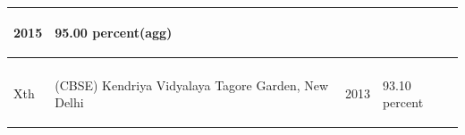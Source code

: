 \documentclass[11pt]{article}
\begin{document}
\begin{minipage}{0.75\linewidth}
\begin{center}
\begin{tabular}{ |m{4cm}| m{4cm}| m{2cm}| m{3cm}| }
\begin{center}
2015
\end{center}&
\begin{center}
95.00 percent(agg)
\end{center}\\
\hline
\begin{center}
AISSE\\
Xth
\end{center}&
\begin{center}
(CBSE) Kendriya Vidyalaya Tagore Garden, New Delhi
\end{center}&
\begin{center}
2013
\end{center}&
\begin{center}
93.10 percent
\end{center}\\
\hline
\end{tabular}
\end{center}
\end{minipage}
\end{document}
